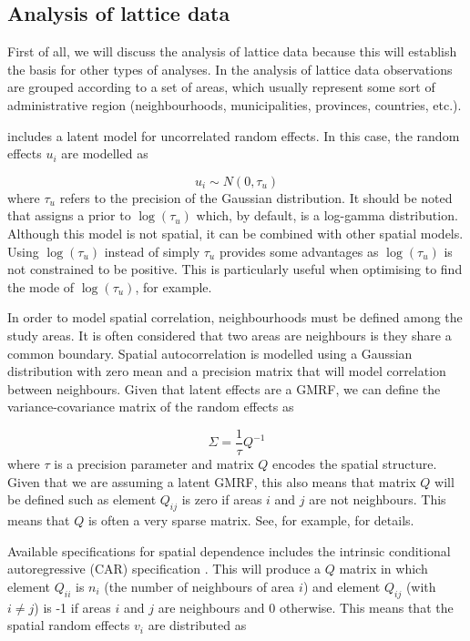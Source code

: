 \documentclass[article]{jss}
\begin{document}
\subsection{Analysis of lattice data}

First of all, we will discuss the analysis of lattice data because this will
establish the basis for other types of analyses. In the analysis of lattice data
observations are grouped according to a set of areas, which usually represent
some sort of administrative region (neighbourhoods, municipalities, provinces,
countries, etc.).

 includes a latent model for uncorrelated random effects. In
this case, the random effects $u_i$ are modelled as

\begin{equation}
u_i \sim N(0, \tau_u)
\end{equation}
\noindent
where $\tau_u$ refers to the precision of the Gaussian distribution.  It should
be noted that  assigns a prior to $\log(\tau_u)$ which, by default,
is a log-gamma  distribution. Although this model is not spatial, it can be
combined with other spatial models. Using $\log(\tau_u)$ instead
of simply $\tau_u$ provides some advantages as $\log(\tau_u)$ is not
constrained to be positive. This is particularly useful when optimising
to find the mode of $\log(\tau_u)$, for example.


In order to model spatial correlation, neighbourhoods must be defined among the
study areas.  It is often considered that two areas are neighbours is they
share a common boundary.  Spatial autocorrelation is modelled using a Gaussian
distribution with zero mean and a precision matrix that will model
correlation between neighbours. Given that latent effects are a GMRF, 
we can define the variance-covariance matrix of the random effects
as

\begin{equation}
\Sigma = \frac{1}{\tau} Q^{-1}
\end{equation}
\noindent
where $\tau$ is a precision parameter and matrix $Q$ encodes
the spatial structure. Given that we are assuming a latent GMRF, this also
means that matrix $Q$ will be defined such as element $Q_{ij}$ is zero if
areas $i$ and $j$ are not neighbours. This means that $Q$ is often a very
sparse matrix. See, for example, \citet{rueheld:2005} 
for details.

Available specifications for spatial dependence includes the intrinsic 
conditional autoregressive (CAR)
specification \citep{besagetal:1991}. This will produce a $Q$ matrix in which
element $Q_{ii}$ is $n_i$ (the number of neighbours of area $i$) and element
$Q_{ij}$ (with $i\neq j$) is -1 if areas $i$ and $j$ are neighbours and 0 otherwise. This
means that the spatial random effects $v_i$ are distributed as
\end{document}
